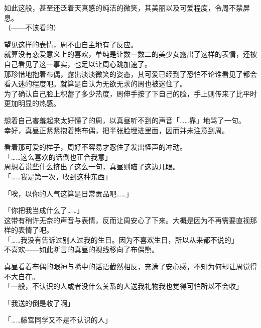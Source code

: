如此这般，甚至还泛着天真感的纯洁的微笑，其美丽以及可爱程度，令周不禁屏息。\\

（——不该看的）

望见这样的表情，周不由自主地有了反应。\\

就算没有恋爱意义上的喜欢，单纯是让数一数二的美少女露出了这样的表情，还被自己看见了这一事实，也足以让周心跳加速了。\\

那珍惜地抱着布偶，露出淡淡微笑的姿态，其可爱已经到了恐怕不论谁看见了都会看入迷的程度吧。就算是自认为无欲无求的周也被迷住了。\\

为了确认自己脸上积蓄了多少热度，周伸手按了下自己的脸，手上则传来了比平时更加明显的热感。

想着自己害羞起来太好懂了的周，以真昼听不到的声音「……靠」地骂了一句。\\

幸好，真昼正紧紧抱着熊布偶，把半张脸埋进里面，因而并未注意到周。

看着那可爱的样子，周好不容易才忍住了发出怪声的冲动。\\

「……这么喜欢的话倒也正合我意」\\

周想着说些什么挤出了这么一句，真昼则瞄了这边几眼。\\

「……我是第一次，收到这种东西」

「唉，以你的人气这算是日常贡品吧……」

「你把我当成什么了……」\\

这带有稍许无奈的声音与表情，反而让周安心了下来。大概是因为不再需要直视那样的表情了吧。\\

「……我没有告诉过别人过我的生日。因为不喜欢生日，所以从来都不说的」\\

不喜欢——如此断言的真昼的视线移向了布偶熊。

真昼看着布偶的眼神与嘴中的话语截然相反，充满了安心感，不知为何却让周觉得不大自在。\\

「一般，不认识的人或者没什么关系的人送我礼物我也觉得可怕所以不会收」

「我送的倒是收了啊」

「……藤宫同学又不是不认识的人」\\

